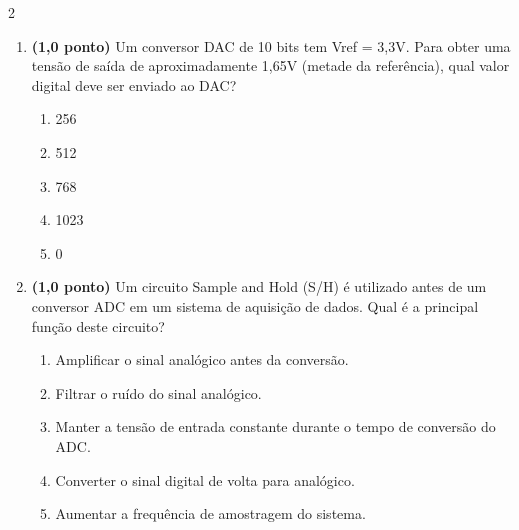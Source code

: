 \documentclass[a4paper,12pt]{article}
\begin{document}
\begin{multicols}{2}
\begin{enumerate}[leftmargin=*]
\vspace{0.2cm}


\item \textbf{(1,0 ponto)} Um conversor DAC de 10 bits tem Vref = 3,3V. Para obter uma tensão de saída de aproximadamente 1,65V (metade da referência), qual valor digital deve ser enviado ao DAC?

\begin{enumerate}[label=(\Alph*)]
    \item 256
    \item 512
    \item 768
    \item 1023
    \item 0
\end{enumerate}

\vspace{0.2cm}


\item \textbf{(1,0 ponto)} Um circuito Sample and Hold (S/H) é utilizado antes de um conversor ADC em um sistema de aquisição de dados. Qual é a principal função deste circuito?

\begin{enumerate}[label=(\Alph*)]
    \item Amplificar o sinal analógico antes da conversão.
    \item Filtrar o ruído do sinal analógico.
    \item Manter a tensão de entrada constante durante o tempo de conversão do ADC.
    \item Converter o sinal digital de volta para analógico.
    \item Aumentar a frequência de amostragem do sistema.
\end{enumerate}


\end{enumerate}

\end{multicols}

\vfill
\end{document}
